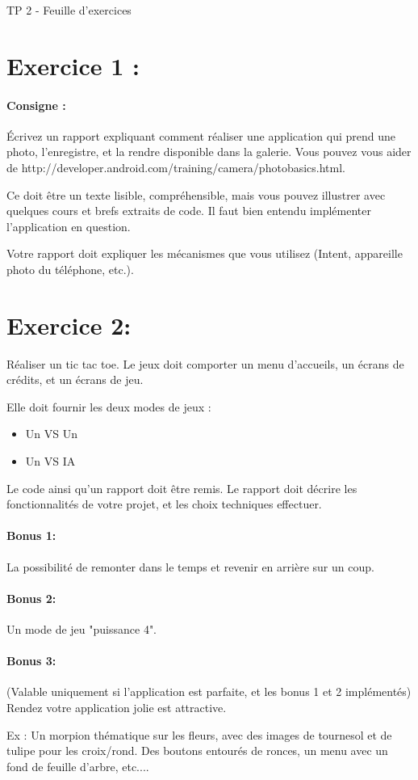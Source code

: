 \documentclass{article}
\begin{document}
\begin{center}
\large\sc TP 2 - Feuille d'exercices
\end{center}

\section{Exercice 1 :} 

\paragraph{Consigne : } Écrivez un rapport expliquant comment réaliser une application qui prend une photo, l'enregistre, et la rendre disponible dans la galerie. Vous pouvez vous aider de http://developer.android.com/training/camera/photobasics.html.

Ce doit être un texte lisible, compréhensible, mais vous pouvez illustrer avec quelques cours et brefs extraits de code.
Il faut bien entendu implémenter l'application en question.

Votre rapport doit expliquer les mécanismes que vous utilisez (Intent, appareille photo du téléphone, etc.).


\section{Exercice 2:}
Réaliser un tic tac toe. Le jeux doit comporter un menu d’accueils, un écrans de crédits, et un écrans de jeu.

Elle doit fournir les deux modes de jeux :
\begin{itemize}
\item Un VS Un
\item Un VS IA
\end{itemize}

Le code ainsi qu'un rapport doit être remis. Le rapport doit décrire les fonctionnalités de votre projet, et les choix techniques effectuer.


\paragraph{Bonus 1:} La possibilité de remonter dans le temps et revenir en arrière sur un coup.

\paragraph{Bonus 2:} Un mode de jeu "puissance 4".

\paragraph{Bonus 3:} (Valable uniquement si l'application est parfaite, et les bonus 1 et 2 implémentés) Rendez votre application jolie est attractive.

Ex : Un morpion thématique sur les fleurs, avec des images de tournesol et de tulipe pour les croix/rond. Des boutons entourés de ronces, un menu avec un fond de feuille d'arbre, etc....
\end{document}

